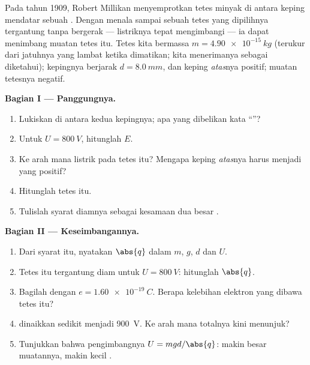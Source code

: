 \begin{problem}
\label{pb:g11:electric-gravitational-fields:1}
Pada tahun 1909, Robert Millikan menyemprotkan tetes minyak di antara
keping mendatar sebuah . Dengan menala  sampai
sebuah tetes yang dipilihnya tergantung tanpa bergerak --- 
listriknya tepat mengimbangi  --- ia dapat menimbang muatan
tetes itu. Tetes kita bermassa $m = \qty{4.90e-15}{kg}$ (terukur dari
jatuhnya yang lambat ketika  dimatikan; kita menerimanya sebagai
diketahui); kepingnya berjarak $d = \qty{8.0}{mm}$, dan keping
\emph{atas}nya positif; muatan tetesnya negatif.

\medskip
\noindent\textbf{Bagian I --- Panggungnya.}
\begin{enumerate}
  \item Lukiskan  di antara kedua kepingnya; apa yang dibelikan
        kata ``''?
  \item Untuk $U = \qty{800}{V}$, hitunglah $E$.
  \item Ke arah mana  listrik pada tetes itu? Mengapa keping
        \emph{atas}nya harus menjadi yang positif?
  \item Hitunglah  tetes itu.
  \item Tulislah syarat diamnya sebagai kesamaan dua besar .
\end{enumerate}

\medskip
\noindent\textbf{Bagian II --- Keseimbangannya.}
\begin{enumerate}[resume]
  \item Dari syarat itu, nyatakan $\abs{q}$ dalam $m$, $g$, $d$ dan $U$.
  \item Tetes itu tergantung diam untuk $U = \qty{800}{V}$: hitunglah
        $\abs{q}$.
  \item Bagilah dengan $e = \qty{1.60e-19}{C}$. Berapa kelebihan
        elektron yang dibawa tetes itu?
  \item {} dinaikkan sedikit menjadi \qty{900}{V}. Ke arah
        mana  totalnya kini menunjuk?
  \item Tunjukkan bahwa  pengimbangnya $U = mgd/\abs{q}$: makin
        besar muatannya, makin kecil .
\end{enumerate}


\end{problem}
